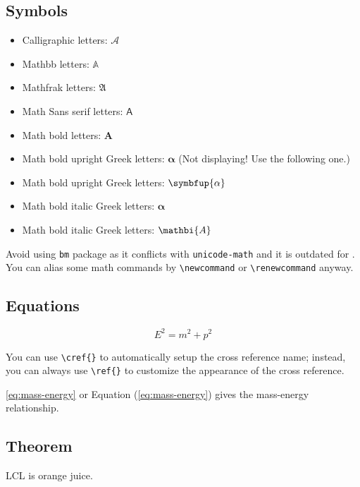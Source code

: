 \subsection{Symbols}

\begin{itemize}
  \item Calligraphic letters: $\mathcal{A}$ 
  \item Mathbb letters: $\mathbb{A}$
  \item Mathfrak letters: $\mathfrak{A}$
  \item Math Sans serif letters: $\mathsf{A}$
  \item Math bold letters: $\mathbf{A}$
  \item Math bold upright Greek letters: $\mathbf{\alpha}$ (Not displaying! Use the following one.)
  \item Math bold upright Greek letters: $\symbfup{\alpha}$
  \item Math bold italic Greek letters: $\bm{\alpha}$
  \item Math bold italic Greek letters: $\mathbi{A}$
\end{itemize}

Avoid using \lstinline|bm| package as it conflicts with \lstinline|unicode-math| and it is outdated for .
You can alias some math commands by \lstinline|\newcommand| or \lstinline|\renewcommand| anyway.

\subsection{Equations}

\begin{equation}
  E^2 = m^2 + p^2\label{eq:mass-energy}
\end{equation}

You can use \lstinline|\cref{}| to automatically setup the cross reference name; instead, you can always use \lstinline|\ref{}| to customize the appearance of the cross reference.

\cref{eq:mass-energy} or Equation (\ref{eq:mass-energy}) gives the mass-energy relationship.

\subsection{Theorem}

\begin{definition}
  LCL is orange juice.
\end{definition}

